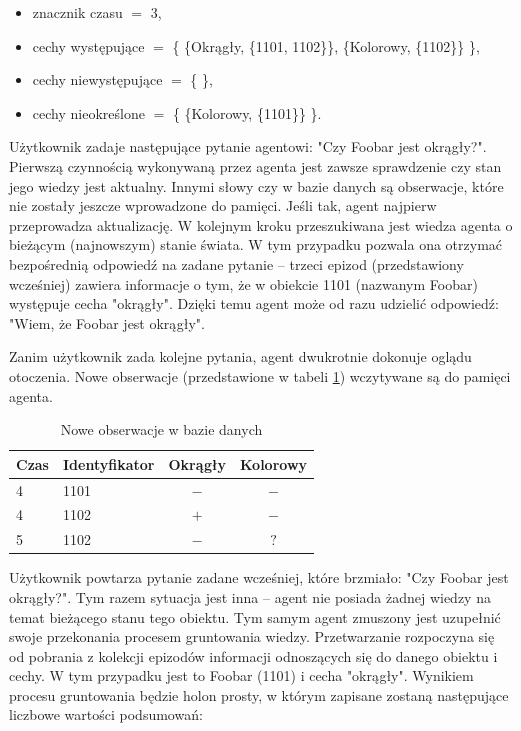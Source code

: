 \begin{itemize}
	\setlength{\itemindent}{.5in}
	\item znacznik czasu $ = $ 3,
	\item cechy występujące $ = $ \{ \{Okrągły, \{1101, 1102\}\}, \{Kolorowy, \{1102\}\} \},
	\item cechy niewystępujące $ = $ \{ \},
	\item cechy nieokreślone $ = $ \{ \{Kolorowy, \{1101\}\} \}.
\end{itemize}  

Użytkownik zadaje następujące pytanie agentowi: "Czy Foobar jest okrągły?". Pierwszą czynnością wykonywaną przez agenta jest zawsze sprawdzenie czy stan jego wiedzy jest aktualny. Innymi słowy czy w bazie danych są obserwacje, które nie zostały jeszcze wprowadzone do pamięci. Jeśli tak, agent najpierw przeprowadza aktualizację. W kolejnym kroku przeszukiwana jest wiedza agenta o bieżącym (najnowszym) stanie świata. W tym przypadku pozwala ona otrzymać bezpośrednią odpowiedź na zadane pytanie -- trzeci epizod (przedstawiony wcześniej) zawiera informacje o tym, że w obiekcie 1101 (nazwanym Foobar) występuje cecha "okrągły". Dzięki temu agent może od razu udzielić odpowiedź: "Wiem, że Foobar jest okrągły".

Zanim użytkownik zada kolejne pytania, agent dwukrotnie dokonuje oglądu otoczenia. Nowe obserwacje (przedstawione w tabeli \ref{tab:obserwacje2}) wczytywane są do pamięci agenta. 

\begin{table}[H]
	\caption{Nowe obserwacje w bazie danych}
	\label{tab:obserwacje2}
	\centering
	\begin{tabular}{|l|l|c|c|} \hline
		\textbf{Czas} & \textbf{Identyfikator} & \textbf{Okrągły} & \textbf{Kolorowy} \\ \hline
		4  &  1101  &  $ - $  &  $ - $  \\ \hline
		4  &  1102  &  $ + $  &  $ - $  \\ \hline
		5  &  1102  &  $ - $  &  $ ? $  \\ \hline
	\end{tabular}
\end{table}

Użytkownik powtarza pytanie zadane wcześniej, które brzmiało: "Czy Foobar jest okrągły?". Tym razem sytuacja jest inna -- agent nie posiada żadnej wiedzy na temat bieżącego stanu tego obiektu. Tym samym agent zmuszony jest uzupełnić swoje przekonania procesem gruntowania wiedzy. Przetwarzanie rozpoczyna się od pobrania z kolekcji epizodów informacji odnoszących się do danego obiektu i cechy. W tym przypadku jest to Foobar (1101) i cecha "okrągły". Wynikiem procesu gruntowania będzie holon prosty, w którym zapisane zostaną następujące liczbowe wartości podsumowań:

